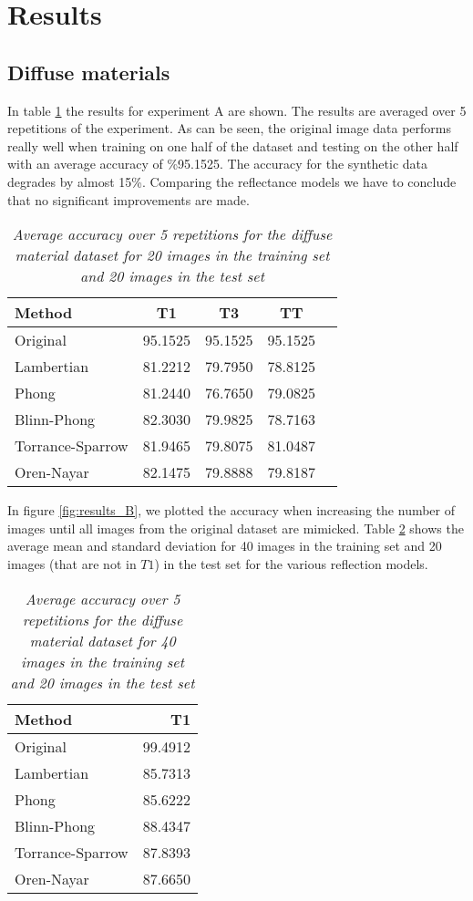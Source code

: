 \section{Results}\label{sec:Results}
\subsection{Diffuse materials}
In table \ref{tab:DiffuseResultsA} the results for experiment A are shown. The results are averaged over 5 repetitions of the experiment. As can be seen, the original image data performs really well when training on one half of the dataset and testing on the other half with an average accuracy of \%95.1525. The accuracy for the synthetic data degrades by almost 15\%. Comparing the reflectance models we have to conclude that no significant improvements are made.
 
\begin{table}
	\center
	\begin{tabular}{l|c|c|c|r}
	Method 				&	T1  	&	T3 		&	TT	\\
	\hline
	Original			&	95.1525	&	95.1525 &	95.1525	\\
	Lambertian 			&	81.2212	&	79.7950	&	78.8125	\\
	Phong 				&	81.2440	&	76.7650 &	79.0825	\\
	Blinn-Phong 		& 	82.3030 &	79.9825 &	78.7163	\\
	Torrance-Sparrow 	&	81.9465 &	79.8075 &	81.0487	\\
	Oren-Nayar 			&	82.1475 &	79.8888 &	79.8187	\\
	\end{tabular}
	\caption{{\it Average accuracy over 5 repetitions for the diffuse material dataset for 20 images in the training set and 20 images in the test set}}
	\label{tab:DiffuseResultsA}
\end{table}

In figure \ref{fig:results_B}, we plotted the accuracy when increasing the number of images until all images from the original dataset are mimicked. Table \ref{tab:DiffuseResultsB} shows the average mean and standard deviation for 40 images in the training set and 20 images (that are not in $T1$) in the test set for the various reflection models.

\begin{table}
	\center
	\begin{tabular}{l|r}
	Method 				&	T1 		\\
	\hline
	Original			&	99.4912	\\
	Lambertian 			&	85.7313	\\
	Phong 				&	85.6222	\\
	Blinn-Phong 		& 	88.4347 \\
	Torrance-Sparrow 	&	87.8393 \\
	Oren-Nayar 			&	87.6650 \\
	\end{tabular}
	\caption{{\it Average accuracy over 5 repetitions for the diffuse material dataset for 40 images in the training set and 20 images in the test set}}
	\label{tab:DiffuseResultsB}
\end{table}

